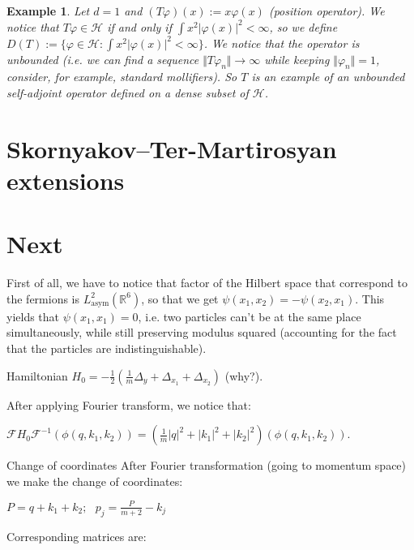 \documentclass[11pt, a4paper, german]{article}
\newtheorem{example}[theorem]{Example}
\numberwithin{equation}{section}
\numberwithin{theorem}{section}
\begin{document}
\begin{example}

Let $d=1$ and $(T \varphi)(x) := x \varphi (x)$ (position operator). We notice that $T \varphi \in \mathcal{H}$ if and only if $\int x^2 |\varphi(x)|^2 < \infty$, so we define $D(T):= \{\varphi \in \mathcal{H} :\int x^2 |\varphi(x)|^2 < \infty \}$. We notice that the operator is unbounded (i.e. we can find a sequence $\Vert T \varphi_n \Vert \rightarrow \infty$ while keeping $\Vert \varphi_n \Vert = 1$, consider, for example, standard mollifiers). So $T$ is an example of an unbounded self-adjoint operator defined on a dense subset of $\mathcal{H}$.

\end{example}


\section{Skornyakov--Ter-Martirosyan extensions}

\section{Next}

First of all, we have to notice that factor of the Hilbert space that correspond to the fermions is $ L ^{2} _{\text{asym} } \left( \mathbb{R}^{6} \right) $, so that we get $ \psi \left( x _{1} , x _{2} \right) = - \psi \left( x _{2} , x _{1} \right) $. This yields that $ \psi \left( x_1, x_1 \right) =0 $, i.e. two particles can't be at the same place simultaneously, while still preserving modulus squared (accounting for the fact that the particles are indistinguishable).

Hamiltonian
$ H _{0} = - \frac{1}{2} \left( \frac{1}{m} \Delta _{y} + \Delta _{x _{1} } + \Delta _{x _{2} } \right) $ (why?).

After applying Fourier transform, we notice that:

$ \mathcal{F} H _{0} \mathcal{F} ^{-1} \left( \phi \left( q, k _{1} , k _{2} \right) \right) = \left( \frac{1}{m} \left| q \right| ^{2} + \left| k _{1} \right| ^{2} + \left| k _{2} \right| ^{2} \right) \left( \phi \left( q, k _{1} , k _{2} \right) \right) $.

Change of coordinates
After Fourier transformation (going to momentum space) we make the change of coordinates:

$ P = q+k _{1} + k _{2} ; \,\,\,\, p _{j} = \frac{P }{m+2} - k _{j} $

Corresponding matrices are:
\end{document}
